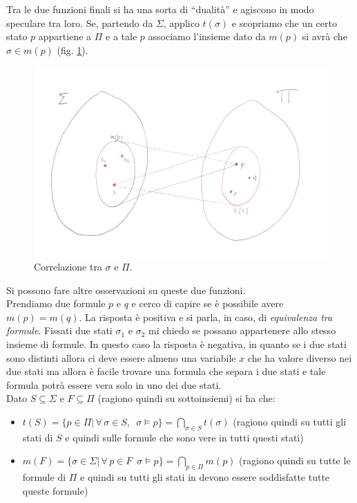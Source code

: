 				      				Tra le due funzioni finali si ha una sorta di ``dualità'' e agiscono in modo
				      				speculare tra loro. Se, partendo da $\Sigma$, applico $t(\sigma)$ e scopriamo
				      				che un certo stato $p$ appartiene a $\Pi$ e a tale $p$ associamo l'insieme dato
				      				da $m(p)$ si avrà che $\sigma\in m(p)$ (fig. \ref{fig:SigmaAndPi}).\\
				      				\begin{figure}[h]
                                        \centering \includegraphics[width=1\textwidth]{img/VENN.png}
                                        \caption{Correlazione tra $\sigma$ e $\Pi$.}
                                        \label{fig:SigmaAndPi}
                                    \end{figure}
				      				Si possono fare altre osservazioni su queste due funzioni. \\
				      				Prendiamo due formule $p$ e $q$ e cerco di capire se è possibile avere
				      				$m(p)=m(q)$. La risposta è positiva e si parla, in caso, di \textit{equivalenza
				      					tra formule}. Fissati due stati $\sigma_1$ e $\sigma_2$ mi chiedo se possano
				      				appartenere allo stesso insieme di formule. In questo caso la risposta è
				      				negativa, in quanto se i due stati sono distinti allora ci deve essere almeno
				      				una variabile $x$ che ha valore diverso nei due stati ma allora è facile trovare
				      				una formula che separa i due stati e tale formula potrà essere vera solo in uno
				      				dei due stati.\\
				      				Dato $S\subseteq \Sigma$ e $F\subseteq\Pi$ (ragiono quindi su sottoinsiemi) si
				      				ha che:
				      				\begin{itemize}
				      					\item $t(S)=\{p\in \Pi|\,\forall\,\sigma\in S,\,\,\,\sigma\vDash
				      					      p\}=\bigcap_{\sigma\in S}t(\sigma)$ (ragiono quindi su tutti gli stati di $S$
				      					      e quindi sulle formule che sono vere in tutti questi stati) 
				      					\item $m(F)=\{\sigma\in \Sigma|\,\forall\,p\in F\,\,\,\sigma\vDash
				      					      p\}=\bigcap_{p\in \Pi}m(p)$ (ragiono quindi su tutte le formule di $\Pi$
				      					      e quindi su tutti gli stati in devono essere soddisfatte tutte queste formule) 
				      				\end{itemize}
